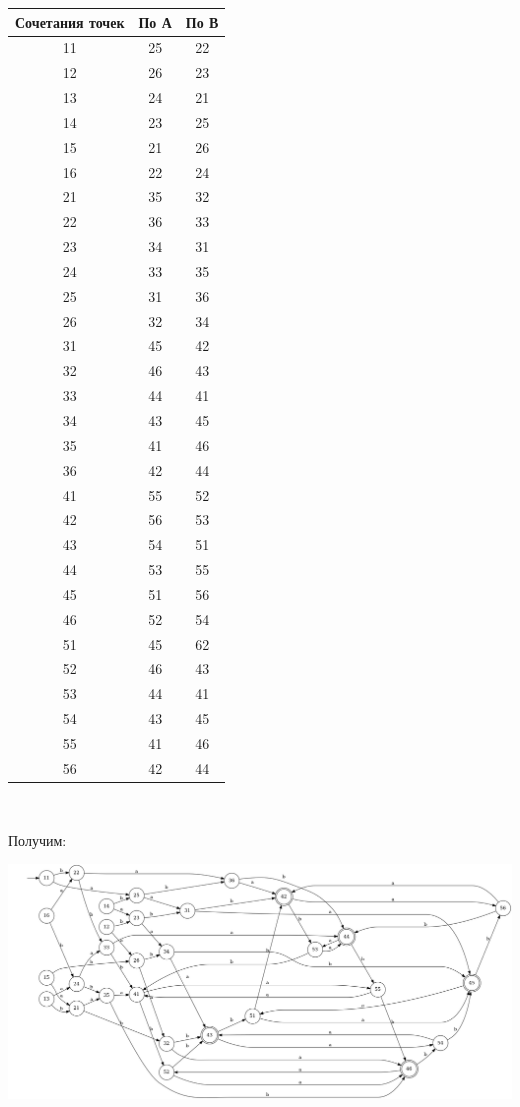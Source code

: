 \documentclass{article}
\begin{document}
    \begin{center}
        \begin{tabular}{|c|c|c|}
            \hline
            Сочетания точек & По А & По В \\
            \hline
            11 & 25 & 22\\
            12 & 26 & 23\\
            13 & 24 & 21\\
            14 & 23 & 25\\
            15 & 21 & 26\\
            16 & 22 & 24\\
            21 & 35 & 32\\
            22 & 36 & 33\\
            23 & 34 & 31\\
            24 & 33 & 35\\
            25 & 31 & 36\\
            26 & 32 & 34\\
            31 & 45 & 42\\
            32 & 46 & 43\\
            33 & 44 & 41\\
            34 & 43 & 45\\
            35 & 41 & 46\\
            36 & 42 & 44\\
            41 & 55 & 52\\
            42 & 56 & 53\\
            43 & 54 & 51\\
            44 & 53 & 55\\
            45 & 51 & 56\\
            46 & 52 & 54\\
            51 & 45 & 62\\
            52 & 46 & 43\\
            53 & 44 & 41\\
            54 & 43 & 45\\
            55 & 41 & 46\\
            56 & 42 & 44\\
            \hline
        \end{tabular}\\
    \end{center}
    Получим:
    \begin{center}
        \includegraphics[width=1\textwidth]{pic2_5_3.dot}\\
    \end{center}
    
\end{document}
